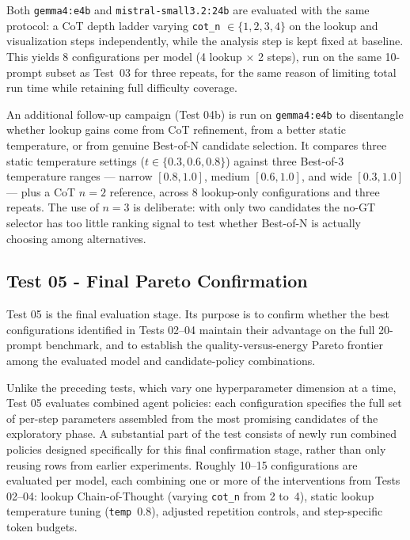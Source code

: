 Both \texttt{gemma4:e4b} and \texttt{mistral-small3.2:24b} are evaluated with
the same protocol: a CoT depth ladder varying \texttt{cot\_n} $\in \{1, 2, 3,
4\}$ on the lookup and visualization steps independently, while the analysis
step is kept fixed at baseline. This yields 8 configurations per model (4
lookup $\times$ 2 steps), run on the same 10-prompt subset as Test~03 for
three repeats, for the same reason of limiting total run time while
retaining full difficulty coverage.

An additional follow-up campaign (Test 04b) is run on \texttt{gemma4:e4b} to
disentangle whether lookup gains come from CoT refinement, from a better static
temperature, or from genuine Best-of-N candidate selection. It compares three
static temperature settings ($t \in \{0.3, 0.6, 0.8\}$) against three
Best-of-3 temperature ranges --- narrow $[0.8,1.0]$, medium $[0.6,1.0]$, and
wide $[0.3,1.0]$ --- plus a CoT $n=2$ reference, across 8 lookup-only
configurations and three repeats. The use of $n=3$ is deliberate: with only
two candidates the no-GT selector has too little ranking signal to test whether
Best-of-N is actually choosing among alternatives.

\subsection{Test 05 - Final Pareto Confirmation}
\label{subsec:test05}

Test 05 is the final evaluation stage. Its purpose is to confirm whether the
best configurations identified in Tests 02--04 maintain their advantage on the
full 20-prompt benchmark, and to establish the quality-versus-energy
Pareto frontier among the evaluated model and candidate-policy combinations.

Unlike the preceding tests, which vary one hyperparameter dimension at a time,
Test 05 evaluates combined agent policies: each configuration specifies the
full set of per-step parameters assembled from the most promising candidates of
the exploratory phase. A substantial part of the test consists of newly run
combined policies designed specifically for this final confirmation stage,
rather than only reusing rows from earlier experiments. Roughly 10--15
configurations are evaluated per model, each combining one or more of the
interventions from Tests 02--04: lookup Chain-of-Thought (varying
\texttt{cot\_n} from 2 to~4), static lookup temperature tuning
(\texttt{temp}~0.8), adjusted repetition controls, and step-specific token
budgets.

